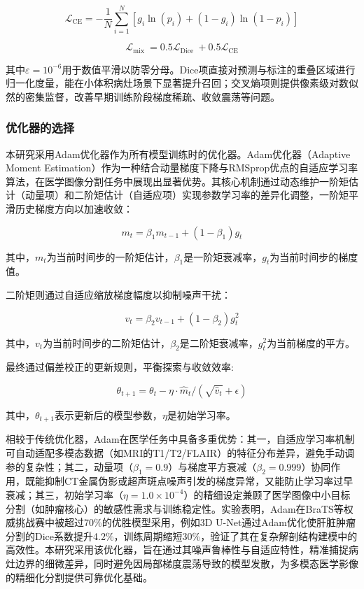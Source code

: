 \begin{equation}
    \mathcal{L}_{\mathrm{CE}}=-\frac{1}{N} \sum_{i=1}^{N}\left[g_{i} \ln \left(p_{i}\right)+\left(1-g_{i}\right) \ln \left(1-p_{i}\right)\right]
\end{equation}

\begin{equation}
    \mathcal{L}_{\text {mix }}=0.5 \mathcal{L}_{\text {Dice }}+0.5 \mathcal{L}_{\mathrm{CE}}
\end{equation}

其中$ \varepsilon=10^{-6} $用于数值平滑以防零分母。Dice项直接对预测与标注的重叠区域进行归一化度量，能在小体积病灶场景下显著提升召回；交叉熵项则提供像素级对数似然的密集监督，改善早期训练阶段梯度稀疏、收敛震荡等问题。

\subsubsection{优化器的选择}

本研究采用Adam优化器作为所有模型训练时的优化器。Adam优化器（Adaptive Moment Estimation）作为一种结合动量梯度下降与RMSprop优点的自适应学习率算法，在医学图像分割任务中展现出显著优势。其核心机制通过动态维护一阶矩估计（动量项）和二阶矩估计（自适应项）实现参数学习率的差异化调整，一阶矩平滑历史梯度方向以加速收敛：

\begin{equation}
    m_t = \beta_1 m_{t-1} + (1 - \beta_1) g_t
\end{equation}

其中，$m_t$为当前时间步的一阶矩估计，$\beta_1$是一阶矩衰减率，$g_t$为当前时间步的梯度值。

二阶矩则通过自适应缩放梯度幅度以抑制噪声干扰：

\begin{equation}
    v_t = \beta_2 v_{t-1} + (1 - \beta_2) g_t^2
\end{equation}

其中，$v_t$为当前时间步的二阶矩估计，$\beta_2$是二阶矩衰减率，$g_t^2$为当前梯度的平方。

最终通过偏差校正的更新规则，平衡探索与收敛效率:

\begin{equation}
    \theta_{t+1} = \theta_t - \eta \cdot \hat{m}_t / (\sqrt{\hat{v}_t} + \epsilon)
\end{equation}

其中，$\theta_{t+1}$表示更新后的模型参数，$\eta$是初始学习率。

相较于传统优化器，Adam在医学任务中具备多重优势：其一，自适应学习率机制可自动适配多模态数据（如MRI的T1/T2/FLAIR）的特征分布差异，避免手动调参的复杂性；其二，动量项（\( \beta_1=0.9 \)）与梯度平方衰减（\( \beta_2=0.999 \)）协同作用，既能抑制CT金属伪影或超声斑点噪声引发的梯度异常，又能防止学习率过早衰减；其三，初始学习率（\( \eta=1.0 \times 10^{-4} \)）的精细设定兼顾了医学图像中小目标分割（如肿瘤核心）的敏感性需求与训练稳定性。实验表明，Adam在BraTS等权威挑战赛中被超过70\%的优胜模型采用，例如3D U-Net通过Adam优化使肝脏肿瘤分割的Dice系数提升4.2\%，训练周期缩短30\%，验证了其在复杂解剖结构建模中的高效性。本研究采用该优化器，旨在通过其噪声鲁棒性与自适应特性，精准捕捉病灶边界的细微差异，同时避免因局部梯度震荡导致的模型发散，为多模态医学影像的精细化分割提供可靠优化基础。

